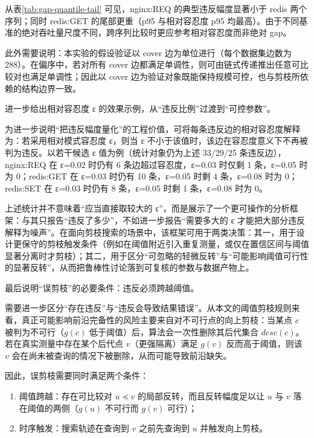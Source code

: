 \documentclass[UTF8,a4paper,12pt,twoside]{ctexart}  %
\begin{document}
从表\ref{tab:gap-quantile-tail} 可见，nginx:REQ 的典型违反幅度显著小于 redis 两个序列；同时 redis:GET 的尾部更重（p95 与相对容忍度 p95 均最高）。由于不同基准的绝对吞吐量尺度不同，跨序列比较时更应参考相对容忍度而非绝对 gap。

此外需要说明：本实验的假设验证以 cover 边为单位进行（每个数据集边数为
288）。在偏序中，若对所有 cover
边都满足单调性，则可由链式传递推出任意可比较对也满足单调性；因此以 cover
边为验证对象既能保持规模可控，也与剪枝所依赖的结构边界一致。

进一步给出相对容忍度 ε 的效果示例，从``违反比例''过渡到``可控参数''。

为进一步说明``把违反幅度量化''的工程价值，可将每条违反边的相对容忍度解释为：若采用相对模式容忍度
ε，则当 ε 不小于该值时，该边在容忍度意义下不再被判为违反。以若干候选 ε
值为例（统计对象仍为上述 33/29/25 条违反边），nginx:REQ 在 ε=0.02 时仍有
6 条边超过容忍度，ε=0.03 时仅剩 1 条，ε=0.05 时为 0；redis:GET 在 ε=0.03
时仍有 10 条，ε=0.05 时剩 4 条，ε=0.08 时为 0；redis:SET 在 ε=0.03
时仍有 8 条，ε=0.05 时剩 1 条，ε=0.08 时为 0。

上述统计并不意味着``应当直接取较大的
ε''，而是展示了一个更可操作的分析框架：与其只报告``违反了多少''，不如进一步报告``需要多大的
ε
才能把大部分违反解释为噪声''。在面向剪枝搜索的场景中，该框架可用于两类决策：其一，用于设计更保守的剪枝触发条件（例如在阈值附近引入重复测量，或仅在置信区间与阈值显著分离时才剪枝）；其二，用于区分``可忽略的轻微反转''与``可能影响阈值可行性的显著反转''，从而把鲁棒性讨论落到可复核的参数与数据产物上。

最后说明``误剪枝''的必要条件：违反必须跨越阈值。

需要进一步区分``存在违反''与``违反会导致结果错误''。从本文的阈值剪枝规则来看，真正可能影响前沿完备性的风险主要来自对不可行点的向上剪枝：当某点
\(c\) 被判为不可行（\(g(c)\) 低于阈值）后，算法会一次性删除其后代集合
\(desc(c)\)。若在真实测量中存在某个后代点 \(v\)（更强隔离）满足 \(g(v)\)
反而高于阈值，则该 \(v\)
会在尚未被查询的情况下被删除，从而可能导致前沿缺失。

因此，误剪枝需要同时满足两个条件：
\begin{enumerate}
\def\labelenumi{\arabic{enumi}.}
\item
  阈值跨越：存在可比较对 \(u\preceq v\)
  的局部反转，而且反转幅度足以让 \(u\) 与 \(v\) 落在阈值的两侧（\(g(u)\)
  不可行而 \(g(v)\) 可行）；
\item
  时序触发：搜索轨迹在查询到 \(v\) 之前先查询到 \(u\)
  并触发向上剪枝。
\end{enumerate}
\end{document}
